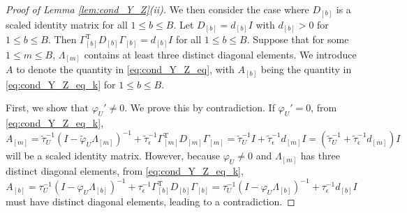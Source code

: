 \documentclass[11pt]{article}
\theoremstyle{definition}
\theoremstyle{remark}
\def\top{{ \mathrm{\scriptscriptstyle T} }}
\begin{document}
\begin{proof}[Proof of Lemma \ref{lem:cond_Y_Z}(ii)]
We then consider the case where $D_{[b]}$ is a scaled identity matrix for all $1\le b \le B$. 
Let $D_{[b]} = d_{[b]} I$ with $d_{[b]}>0$ for $1\le b \le B$. Then $ \Gamma_{[b]}^\top D_{[b]} \Gamma_{[b]} = d_{[b]}I$ for all $1\le b \le B$.
Suppose that for some $1\le m \le B$, 
$\Lambda_{[m]}$ contains at least three distinct diagonal elements. 
We introduce $A$ to denote the quantity in \eqref{eq:cond_Y_Z_eq}, with $A_{[b]}$ being the quantity in \eqref{eq:cond_Y_Z_eq_k} for $1\le b \le B$. 


First, we show that $\varphi_{U}' \ne 0$. We prove this by contradiction.  
If $\varphi_{U}' = 0$, 
from \eqref{eq:cond_Y_Z_eq_k}, 
$$A_{[m]} = \tilde{\tau}_U^{-1} (I-\tilde{\varphi}_U \Lambda_{[m]})^{-1} 
    +\tilde{\tau}_{\epsilon}^{-1} \Gamma_{[m]}^\top D_{[m]} \Gamma_{[m]} = \tilde{\tau}_U^{-1} I 
    +\tilde{\tau}_{\epsilon}^{-1} d_{[m]} I = (\tilde{\tau}_U^{-1}+\tilde{\tau}_{\epsilon}^{-1} d_{[m]})I$$ 
will be a scaled identity matrix. 
However, because $\varphi_U \ne 0$ and $\Lambda_{[m]}$ has three distinct diagonal elements, 
from \eqref{eq:cond_Y_Z_eq_k}, 
$$
A_{[b]} = \tau_U^{-1} (I-\varphi_U \Lambda_{[b]})^{-1} 
    +\tau_{\epsilon}^{-1} \Gamma_{[b]}^\top D_{[b]} \Gamma_{[b]}
= \tau_U^{-1} (I-\varphi_U \Lambda_{[b]})^{-1} + \tau_{\epsilon}^{-1} d_{[b]} I
$$
must have distinct diagonal elements, leading to a contradiction. 


\end{proof}
\end{document}
